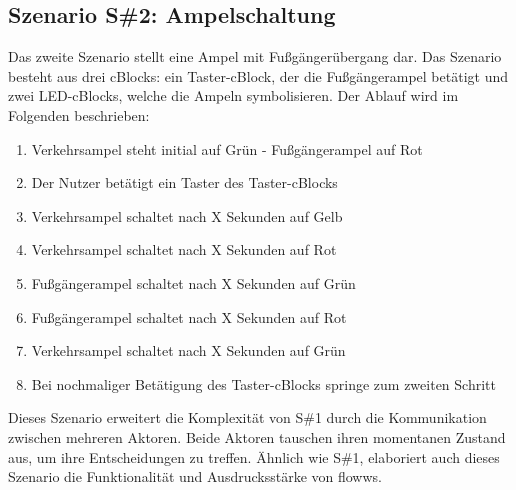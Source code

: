 \subsection{Szenario S\#2: Ampelschaltung\label{szenario2}}
Das zweite Szenario stellt eine Ampel mit Fußgängerübergang dar. Das Szenario besteht aus drei \acp{cBlock}: ein Taster-cBlock, der die Fußgängerampel betätigt und zwei LED-cBlocks, welche die Ampeln symbolisieren. Der Ablauf wird im Folgenden beschrieben: 
\begin{enumerate}
    \item Verkehrsampel steht initial auf Grün - Fußgängerampel auf Rot
    \item Der Nutzer betätigt ein Taster des Taster-cBlocks
    \item Verkehrsampel schaltet nach X Sekunden auf Gelb
    \item Verkehrsampel schaltet nach X Sekunden auf Rot
    \item Fußgängerampel schaltet nach X Sekunden auf Grün
    \item Fußgängerampel schaltet nach X Sekunden auf Rot
    \item Verkehrsampel schaltet nach X Sekunden auf Grün
    \item Bei nochmaliger Betätigung des Taster-cBlocks springe zum zweiten Schritt
\end{enumerate}
Dieses Szenario erweitert die Komplexität von S\#1 durch die Kommunikation zwischen mehreren Aktoren. Beide Aktoren tauschen ihren momentanen Zustand aus, um ihre Entscheidungen zu treffen. Ähnlich wie S\#1, elaboriert auch dieses Szenario die Funktionalität und Ausdrucksstärke von flowws.

